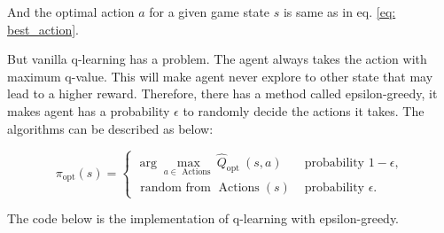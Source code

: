 \documentclass{article}[12pt]
\begin{document}
And the optimal action $a$ for a given game state $s$ is same as in eq. \ref{eq: best_action}.

But vanilla q-learning has a problem. The agent always takes the action with maximum q-value. This will make agent never explore to other state that may lead to a higher reward. Therefore, there has a method called epsilon-greedy, it makes agent has a probability $\epsilon$ to randomly decide the actions it takes. The algorithms can be described as below:

\begin{equation}
\pi_{\mathrm{opt}}(s)= \begin{cases}\arg \max _{a \in \text { Actions }} \hat{Q}_{\text {opt }}(s, a) & \text { probability } 1-\epsilon, \\ \text { random from } \operatorname{Actions}(s) & \text { probability } \epsilon .\end{cases}
\end{equation}

The code below is the implementation of q-learning with epsilon-greedy.
\end{document}
